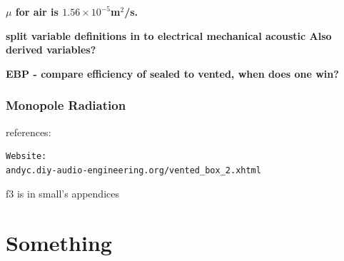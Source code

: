 \documentclass[10pt,letterpaper]{book}
\begin{document}
\textbf{$\mu$ for air is $1.56\times10^{-5}$m$^2$/s.}

\textbf{split variable definitions in to electrical mechanical acoustic Also derived variables?}

\textbf{EBP - compare efficiency of sealed to vented, when does one win?}

\subsection{Monopole Radiation}


references:
\begin{verbatim}
Website:
andyc.diy-audio-engineering.org/vented_box_2.xhtml
\end{verbatim}
f3 is in small's appendices

\appendix

\chapter{Something}

 
\end{document}

